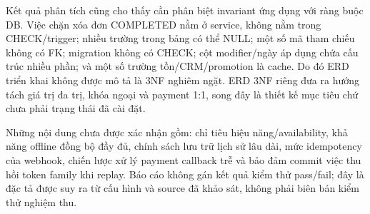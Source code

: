 \documentclass[12pt,a4paper,oneside]{report}
\begin{document}
Kết quả phân tích cũng cho thấy cần phân biệt invariant ứng dụng với ràng buộc DB. Việc chặn xóa đơn COMPLETED nằm ở service, không nằm trong CHECK/trigger; nhiều trường trong bảng có thể NULL; một số mã tham chiếu không có FK; migration không có CHECK; cột modifier/ngày áp dụng chứa cấu trúc nhiều phần; và một số trường tồn/CRM/promotion là cache. Do đó ERD triển khai không được mô tả là 3NF nghiêm ngặt. ERD 3NF riêng đưa ra hướng tách giá trị đa trị, khóa ngoại và payment 1:1, song đây là thiết kế mục tiêu chứ chưa phải trạng thái đã cài đặt.

Những nội dung chưa được xác nhận gồm: chỉ tiêu hiệu năng/availability, khả năng offline đồng bộ đầy đủ, chính sách lưu trữ lịch sử lâu dài, mức idempotency của webhook, chiến lược xử lý payment callback trễ và bảo đảm commit việc thu hồi token family khi replay. Báo cáo không gán kết quả kiểm thử pass/fail; đây là đặc tả được suy ra từ cấu hình và source đã khảo sát, không phải biên bản kiểm thử nghiệm thu.
\end{document}
